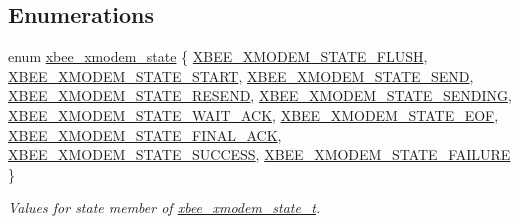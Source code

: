 \subsection*{Enumerations}
\begin{DoxyCompactItemize}
\item 
enum \hyperlink{group__util__xmodem_gaca3fc49d80cd9afccc34812b2985484f}{xbee\+\_\+xmodem\+\_\+state} \{ \newline
\hyperlink{group__util__xmodem_ggaca3fc49d80cd9afccc34812b2985484fa0a84e83220282fadef6bcee5b42fd02f}{X\+B\+E\+E\+\_\+\+X\+M\+O\+D\+E\+M\+\_\+\+S\+T\+A\+T\+E\+\_\+\+F\+L\+U\+SH}, 
\hyperlink{group__util__xmodem_ggaca3fc49d80cd9afccc34812b2985484fa35f508b4cdce4d950e327aa7fe73e9df}{X\+B\+E\+E\+\_\+\+X\+M\+O\+D\+E\+M\+\_\+\+S\+T\+A\+T\+E\+\_\+\+S\+T\+A\+RT}, 
\hyperlink{group__util__xmodem_ggaca3fc49d80cd9afccc34812b2985484fa53ac0249ccdeb684c78baee336d65187}{X\+B\+E\+E\+\_\+\+X\+M\+O\+D\+E\+M\+\_\+\+S\+T\+A\+T\+E\+\_\+\+S\+E\+ND}, 
\hyperlink{group__util__xmodem_ggaca3fc49d80cd9afccc34812b2985484facb6bc4306d97a0b11b1ad879725df3b5}{X\+B\+E\+E\+\_\+\+X\+M\+O\+D\+E\+M\+\_\+\+S\+T\+A\+T\+E\+\_\+\+R\+E\+S\+E\+ND}, 
\newline
\hyperlink{group__util__xmodem_ggaca3fc49d80cd9afccc34812b2985484fac9e012359b6cf5f45ea6f2f5f9d76d4d}{X\+B\+E\+E\+\_\+\+X\+M\+O\+D\+E\+M\+\_\+\+S\+T\+A\+T\+E\+\_\+\+S\+E\+N\+D\+I\+NG}, 
\hyperlink{group__util__xmodem_ggaca3fc49d80cd9afccc34812b2985484fad7ce55b9d8ec65fa4f8410590cb67eaa}{X\+B\+E\+E\+\_\+\+X\+M\+O\+D\+E\+M\+\_\+\+S\+T\+A\+T\+E\+\_\+\+W\+A\+I\+T\+\_\+\+A\+CK}, 
\hyperlink{group__util__xmodem_ggaca3fc49d80cd9afccc34812b2985484fac0f165be362c1a05448acb718d15299c}{X\+B\+E\+E\+\_\+\+X\+M\+O\+D\+E\+M\+\_\+\+S\+T\+A\+T\+E\+\_\+\+E\+OF}, 
\hyperlink{group__util__xmodem_ggaca3fc49d80cd9afccc34812b2985484fae1a85fb72853aa9b4b2b1ef7734315a4}{X\+B\+E\+E\+\_\+\+X\+M\+O\+D\+E\+M\+\_\+\+S\+T\+A\+T\+E\+\_\+\+F\+I\+N\+A\+L\+\_\+\+A\+CK}, 
\newline
\hyperlink{group__util__xmodem_ggaca3fc49d80cd9afccc34812b2985484fac17280139c0e7d88f3c6371bda3f7123}{X\+B\+E\+E\+\_\+\+X\+M\+O\+D\+E\+M\+\_\+\+S\+T\+A\+T\+E\+\_\+\+S\+U\+C\+C\+E\+SS}, 
\hyperlink{group__util__xmodem_ggaca3fc49d80cd9afccc34812b2985484faf97088a6d2705daabd8e016542aa112e}{X\+B\+E\+E\+\_\+\+X\+M\+O\+D\+E\+M\+\_\+\+S\+T\+A\+T\+E\+\_\+\+F\+A\+I\+L\+U\+RE}
 \}\begin{DoxyCompactList}\small\item\em Values for {\ttfamily state} member of \hyperlink{structxbee__xmodem__state__t}{xbee\+\_\+xmodem\+\_\+state\+\_\+t}. \end{DoxyCompactList}
\end{DoxyCompactItemize}
